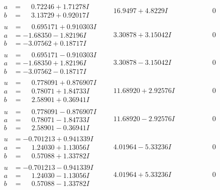 \documentclass[1p]{elsarticle_modified}
\theoremstyle{definition}
\begin{document}
$$\begin{array}{c|c|c}
\begin{aligned}
a &= \phantom{-}0.72246 + 1.71278 I \\
b &= \phantom{-}3.13729 + 0.92017 I\end{aligned}
 & \phantom{-}16.9497 + 4.8229 I & \phantom{-0.000000 } 0 \\ \hline\begin{aligned}
u &= \phantom{-}0.695171 + 0.910303 I \\
a &= -1.68350 - 1.82196 I \\
b &= -3.07562 + 0.18717 I\end{aligned}
 & \phantom{-}3.30878 + 3.15042 I & \phantom{-0.000000 } 0 \\ \hline\begin{aligned}
u &= \phantom{-}0.695171 - 0.910303 I \\
a &= -1.68350 + 1.82196 I \\
b &= -3.07562 - 0.18717 I\end{aligned}
 & \phantom{-}3.30878 - 3.15042 I & \phantom{-0.000000 } 0 \\ \hline\begin{aligned}
u &= \phantom{-}0.778091 + 0.876907 I \\
a &= \phantom{-}0.78071 + 1.84733 I \\
b &= \phantom{-}2.58901 + 0.36941 I\end{aligned}
 & \phantom{-}11.68920 + 2.92576 I & \phantom{-0.000000 } 0 \\ \hline\begin{aligned}
u &= \phantom{-}0.778091 - 0.876907 I \\
a &= \phantom{-}0.78071 - 1.84733 I \\
b &= \phantom{-}2.58901 - 0.36941 I\end{aligned}
 & \phantom{-}11.68920 - 2.92576 I & \phantom{-0.000000 } 0 \\ \hline\begin{aligned}
u &= -0.701213 + 0.941339 I \\
a &= \phantom{-}1.24030 + 1.13056 I \\
b &= \phantom{-}0.57088 + 1.33782 I\end{aligned}
 & \phantom{-}4.01964 - 5.33236 I & \phantom{-0.000000 } 0 \\ \hline\begin{aligned}
u &= -0.701213 - 0.941339 I \\
a &= \phantom{-}1.24030 - 1.13056 I \\
b &= \phantom{-}0.57088 - 1.33782 I\end{aligned}
 & \phantom{-}4.01964 + 5.33236 I & \phantom{-0.000000 } 0\\

\end{array}$$
\end{document}
